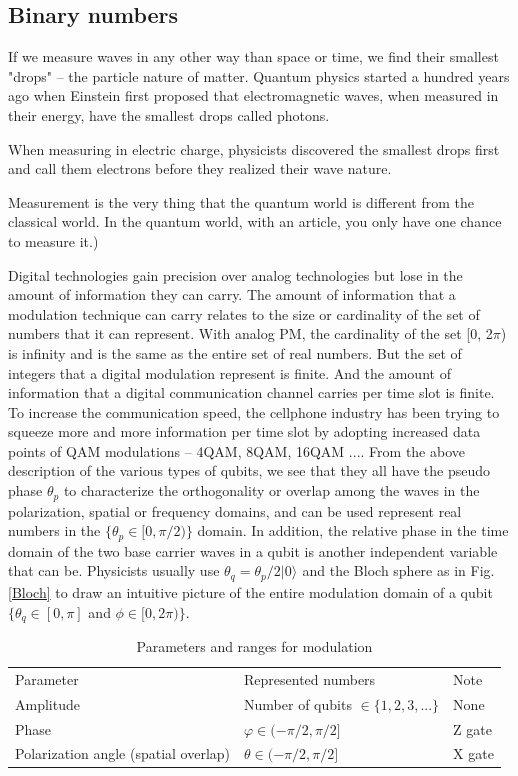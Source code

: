 \documentclass{book}
\newcommand{\keta}[2][]{\vert {#2} \rangle_{#1}}
\begin{document}
\subsection{Binary numbers}

If we measure waves in any other way than space or time, we find their smallest "drops" -- the particle nature of matter. Quantum physics started a hundred years ago when Einstein first proposed that electromagnetic waves, when measured in their energy, have the smallest drops called photons.

When measuring in electric charge, physicists discovered the smallest drops first and call them electrons before they realized their wave nature.

Measurement is the very thing that the quantum world is different from the classical world. In the quantum world, with an article, you only have one chance to measure it.)

Digital technologies gain precision over analog technologies but lose in the amount of information they can carry. The amount of information that a modulation technique can carry relates to the size or cardinality of the set of numbers that it can represent. With analog PM, the cardinality of the set [0, 2$\pi$) is infinity and is the same as the entire set of real numbers. But the set of integers that a digital modulation represent is finite. And the amount of information that a digital communication channel carries per time slot is finite. To increase the communication speed, the cellphone industry has been trying to squeeze more and more information per time slot by adopting increased data points of QAM modulations -- 4QAM, 8QAM, 16QAM ....
From the above description of the various types of qubits, we see that they all have the pseudo phase $\theta_p$ to characterize the 
orthogonality or overlap among the waves in the polarization, spatial or frequency domains, and can be used represent real numbers in the $\{\theta_p \in [0, \pi/2)\}$ domain. In addition, the relative phase in the time domain of the two base carrier waves in a qubit is another independent variable that can be. Physicists usually use $\theta_q = \theta_p/2 \keta{0}$ and the Bloch sphere as in Fig. \ref{Bloch} to draw an intuitive picture of the entire modulation domain of a qubit $\{\theta_q \in [0, \pi]$ and $\phi \in [0, 2\pi)\}$.

\begin{table}[]
\caption{Parameters and ranges for modulation}
\label{modulation-parameters}
\begin{tabular}{lll}
Parameter &Represented numbers &Note                 \\
Amplitude &Number of qubits $\in \{1, 2, 3, ...\}$   & None \\
Phase & $\varphi \in (-\pi /2, \pi /2] $& Z gate \\
Polarization angle (spatial overlap) & $\theta \in (-\pi /2, \pi /2]$ &X gate
\end{tabular}
\end{table}
\end{document}
